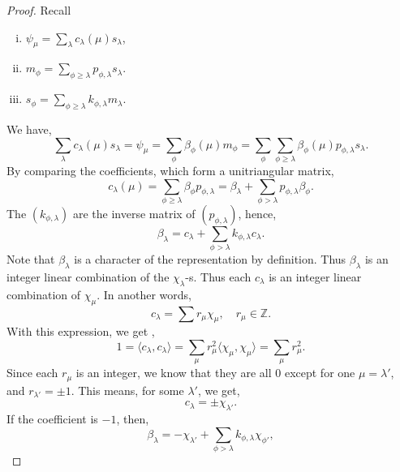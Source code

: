 \documentclass[10pt]{article}
\numberwithin{equation}{theorem}
\newcommand{\Z}[0]{\mathbb{Z}}
\begin{document}
\begin{proof}
  Recall 
  \begin{enumerate}[i).]
    \item $\psi_\mu = \sum_{\lambda}c_\lambda(\mu)s_\lambda$,
    \item $m_\phi = \sum_{\phi\geq\lambda}p_{\phi,\lambda}s_\lambda$.
    \item $s_\phi = \sum_{\phi\geq\lambda}k_{\phi,\lambda}m_\lambda$.
  \end{enumerate}
  We have,
  \begin{equation*}
    \sum_{\lambda}c_\lambda(\mu)s_\lambda = \psi_{\mu}=\sum_{\phi}\beta_\phi(\mu)m_\phi = \sum_{\phi}\sum_{\phi\geq\lambda}\beta_\phi(\mu)p_{\phi,\lambda}s_\lambda.
  \end{equation*}
  By comparing the coefficients, which form a unitriangular matrix,
  \begin{equation*}
    c_\lambda(\mu) = \sum_{\phi\geq \lambda} \beta_\phi p_{\phi,\lambda} = \beta_\lambda+\sum_{\phi>\lambda}p_{\phi,\lambda}\beta_\phi.
  \end{equation*}
  The $(k_{\phi,\lambda})$ are the inverse matrix of $(p_{\phi,\lambda})$, hence,
  \begin{equation}
    \beta_\lambda = c_\lambda+\sum_{\phi>\lambda}k_{\phi,\lambda}c_\lambda.\label{dagger_beta_lambda}
  \end{equation}
  Note that $\beta_\lambda$ is a character of the representation by definition. Thus $\beta_\lambda$ is an integer linear combination of the $\chi_\lambda$-s.
  Thus each $c_\lambda$ is an integer linear combination of $\chi_\mu$. In another words,
  \begin{equation*}
    c_\lambda = \sum r_\mu\chi_\mu,\quad r_\mu\in\Z.
  \end{equation*}
  With this expression, we get ,
  \begin{equation*}
    1 = \langle c_\lambda,c_\lambda\rangle = \sum_{\mu} r_\mu^2\langle \chi_\mu,\chi_\mu\rangle = \sum_{\mu}r_\mu^2.
  \end{equation*}
  Since each $r_\mu$ is an integer, we know that they are all $0$ except for one $\mu=\lambda'$, and $r_{\lambda'} = \pm1$. This means, for some $\lambda'$, we get,
  \begin{equation*}
    c_\lambda = \pm\chi_{\lambda'}.
  \end{equation*}
  If the coefficient is $-1$, then,
  \begin{equation*}
  \beta_\lambda = -\chi_{\lambda'}+\sum_{\phi>\lambda}k_{\phi,\lambda}\chi_{\phi'},

\end{equation*}
\end{proof}
\end{document}
